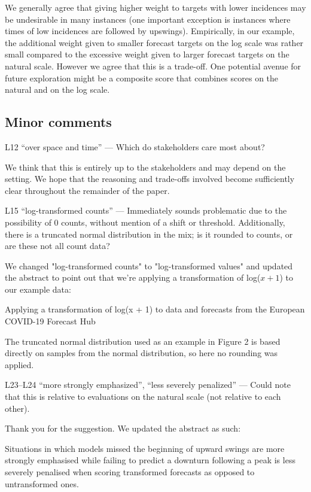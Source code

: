 \documentclass{article}
\newcommand{\black}{\color{black}}
\newcommand{\blue}{\color{blue}}
\newcommand{\indented}{\setlength{\leftskip}{1cm}}
\newcommand{\notindented}{\setlength{\leftskip}{0cm}}
\begin{document}
\black 
We generally agree that giving higher weight to targets with lower incidences may be undesirable in many instances (one important exception is instances where times of low incidences are followed by upswings). Empirically, in our example, the additional weight given to smaller forecast targets on the log scale was rather small compared to the excessive weight given to larger forecast targets on the natural scale. However we agree that this is a trade-off. One potential avenue for future exploration might be a composite score that combines scores on the natural and on the log scale. 

\subsection{Minor comments}

\blue
L12 “over space and time” — Which do stakeholders care most about?

\black
We think that this is entirely up to the stakeholders and may depend on the setting. We hope that the reasoning and trade-offs involved become sufficiently clear throughout the remainder of the paper. 

\blue
L15 “log-transformed counts” — Immediately sounds problematic due to the possibility of 0 counts, without mention of a shift or threshold. Additionally, there is a truncated normal distribution in the mix; is it rounded to counts, or are these not all count data?

\black
We changed "log-transformed counts" to "log-transformed values" and updated the abstract to point out that we're applying a transformation of log($x + 1$) to our example data: 

\indented
Applying a transformation of log(x + 1) to data and forecasts from the European COVID-19 Forecast Hub

\notindented

The truncated normal distribution used as an example in Figure 2 is based directly on samples from the normal distribution, so here no rounding was applied. 

\blue
L23–L24 “more strongly emphasized”, “less severely penalized” — Could note that this is relative to evaluations on the natural scale (not relative to each other).

\black
Thank you for the suggestion. We updated the abstract as such: 

\indented
Situations in which models missed the beginning of upward swings are more strongly emphasised while failing to predict a downturn following a peak is less severely penalised when scoring transformed forecasts as opposed to untransformed ones.
\end{document}
